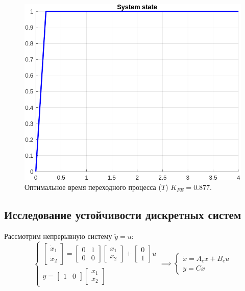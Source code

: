 \documentclass[a4paper, 14pt]{extarticle}
\theoremstyle{definition}
\theoremstyle{plain}
\theoremstyle{remark}
\begin{document}
\begin{figure}
    [H]
    \centering
    \includegraphics[width=350pt]{images/task1_e__optim_state.png}
    \caption{Оптимальное время переходного процесса ($T$) $K_{FE}=0.877$.}
\end{figure}

\subsection{Исследование устойчивости дискретных систем}
Рассмотрим непрерывную систему $\ddot{y} = u$:
\begin{equation}
	\begin{cases}
		\begin{bmatrix}
			\dot{x}_1 \\ \dot{x}_2
		\end{bmatrix} = 
		\begin{bmatrix}
			0 & 1 \\ 0 & 0
		\end{bmatrix}
		\begin{bmatrix}
			x_1 \\ x_2
		\end{bmatrix} + 
		\begin{bmatrix}
			0 \\ 1
		\end{bmatrix}u \\
		y = \begin{bmatrix}
			1 & 0
		\end{bmatrix} \begin{bmatrix}
			x_1 \\ x_2
		\end{bmatrix}
	\end{cases}
	\implies
	\begin{cases}
		\dot{x}=A_cx + B_cu \\
		y = Cx
	\end{cases}
\end{equation}
\end{document}
